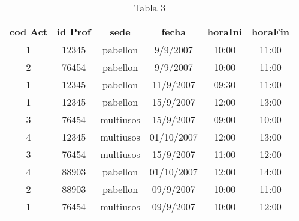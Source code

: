 \documentclass[letterpaper,12pt]{article}
\begin{document}
    \begin{table}[h!]
        \begin{center}
        \begin{tabular}{|c|c|c|c|c|c|}
        \hline
        \textbf{cod Act }&\textbf{ id Prof}&\textbf{sede}&\textbf{fecha}&\textbf{horaIni}&\textbf{horaFin}\\
        \hline
        
        1 & 12345 & pabellon & 9/9/2007 & 10:00 & 11:00 \\\hline
        2 & 76454 & pabellon & 9/9/2007 & 10:00 & 11:00 \\\hline
        1 & 12345 & pabellon & 11/9/2007 & 09:30 & 11:00 \\\hline
        1 & 12345 & pabellon & 15/9/2007 & 12:00 & 13:00 \\\hline
        3 & 76454 & multiusos & 15/9/2007 & 09:00 & 10:00 \\\hline
        4 & 12345 & multiusos & 01/10/2007 & 12:00 & 13:00 \\\hline
        3 & 76454 & multiusos & 15/9/2007 & 11:00 & 12:00 \\\hline
        4 & 88903 & pabellon & 01/10/2007 & 12:00 & 14:00 \\\hline
        2 & 88903 & pabellon & 09/9/2007 & 10:00 & 11:00 \\\hline
        1 & 76454 & multiusos & 09/9/2007 & 10:00 & 12:00 \\\hline

        
        \end{tabular}
        \end{center}
        \caption{Tabla 3}
    \end{table}
\end{document}
